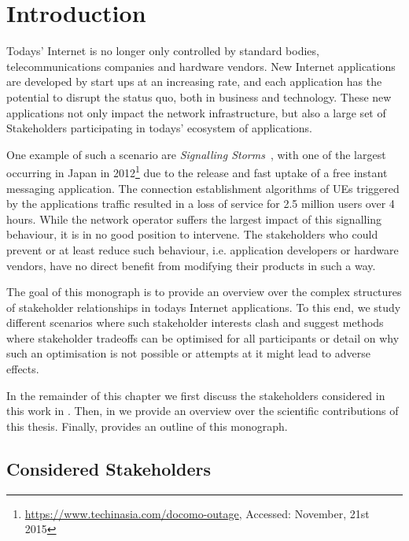 \chapter{Introduction}\label{chap:introduction}

Todays' Internet is no longer only controlled by standard bodies, telecommunications companies and hardware vendors. 
New Internet applications are developed by start ups at an increasing rate, and each application has the potential to disrupt the status quo, both in business and technology.
These new applications not only impact the network infrastructure, but also a large set of Stakeholders participating in todays' ecosystem of applications.

One example of such a scenario are \emph{Signalling Storms}~\cite{Huawei2011}, with one of the largest occurring in Japan in 2012\footnote{\url{https://www.techinasia.com/docomo-outage}, Accessed: November, 21st 2015} due to the release and fast uptake of a free instant messaging application.
The connection establishment algorithms of \glspl{UE} triggered by the applications traffic resulted in a loss of service for 2.5 million users over 4 hours.
While the network operator suffers the largest impact of this signalling behaviour, it is in no good position to intervene.
The stakeholders who could prevent or at least reduce such behaviour, i.e. application developers or hardware vendors, have no direct benefit from modifying their products in such a way.  

The goal of this monograph is to provide an overview over the complex structures of stakeholder relationships in todays Internet applications.
To this end, we study different scenarios where such stakeholder interests clash and suggest methods where stakeholder tradeoffs can be optimised for all participants or detail on why such an optimisation is not possible or attempts at it might lead to adverse effects.

In the remainder of this chapter we first discuss the stakeholders considered in this work in .
Then, in  we provide an overview over the scientific contributions of this thesis.
Finally,  provides an outline of this monograph.

\section{Considered Stakeholders}\label{sec:introduction:considered_stakeholders}

